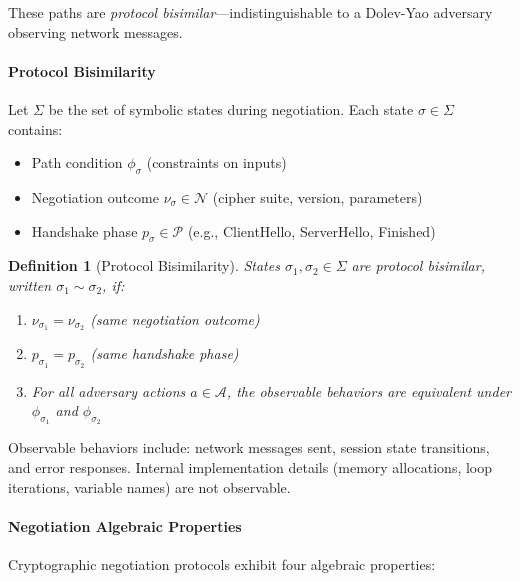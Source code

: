 \documentclass[10pt,twocolumn]{article}
\newtheorem{definition}{Definition}
\begin{document}
These paths are \emph{protocol bisimilar}—indistinguishable to a Dolev-Yao adversary observing network messages.

\paragraph{Protocol Bisimilarity}
Let $\Sigma$ be the set of symbolic states during negotiation. Each state $\sigma \in \Sigma$ contains:
\begin{itemize}[leftmargin=*,noitemsep]
\item Path condition $\phi_\sigma$ (constraints on inputs)
\item Negotiation outcome $\nu_\sigma \in \mathcal{N}$ (cipher suite, version, parameters)
\item Handshake phase $p_\sigma \in \mathcal{P}$ (e.g., ClientHello, ServerHello, Finished)
\end{itemize}

\begin{definition}[Protocol Bisimilarity]
States $\sigma_1, \sigma_2 \in \Sigma$ are \emph{protocol bisimilar}, written $\sigma_1 \sim \sigma_2$, if:
\begin{enumerate}[leftmargin=*,noitemsep]
\item $\nu_{\sigma_1} = \nu_{\sigma_2}$ (same negotiation outcome)
\item $p_{\sigma_1} = p_{\sigma_2}$ (same handshake phase)
\item For all adversary actions $a \in \mathcal{A}$, the observable behaviors are equivalent under $\phi_{\sigma_1}$ and $\phi_{\sigma_2}$
\end{enumerate}
\end{definition}

\noindent Observable behaviors include: network messages sent, session state transitions, and error responses. Internal implementation details (memory allocations, loop iterations, variable names) are not observable.

\paragraph{Negotiation Algebraic Properties}
Cryptographic negotiation protocols exhibit four algebraic properties:
\end{document}
